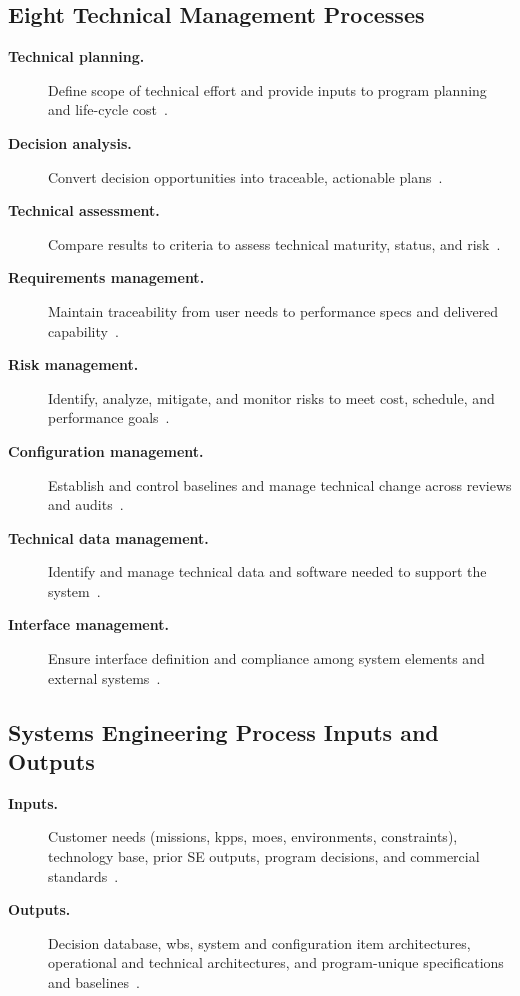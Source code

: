 \documentclass[../main.tex]{subfiles}
\begin{document}
\subsection{Eight Technical Management Processes}
\begin{description}
  \item[\textbf{Technical planning.}] Define scope of technical effort and provide inputs to program planning and life-cycle cost~\autocite{edo-3-5-1-systems-engineering-overview-2025}.
  \item[\textbf{Decision analysis.}] Convert decision opportunities into traceable, actionable plans~\autocite{edo-3-5-1-systems-engineering-overview-2025}.
  \item[\textbf{Technical assessment.}] Compare results to criteria to assess technical maturity, status, and risk~\autocite{edo-3-5-1-systems-engineering-overview-2025}.
  \item[\textbf{Requirements management.}] Maintain traceability from user needs to performance specs and delivered capability~\autocite{edo-3-5-1-systems-engineering-overview-2025}.
  \item[\textbf{Risk management.}] Identify, analyze, mitigate, and monitor risks to meet cost, schedule, and performance goals~\autocite{edo-3-5-1-systems-engineering-overview-2025}.
  \item[\textbf{Configuration management.}] Establish and control baselines and manage technical change across reviews and audits~\autocite{edo-3-5-1-systems-engineering-overview-2025}.
  \item[\textbf{Technical data management.}] Identify and manage technical data and software needed to support the system~\autocite{edo-3-5-1-systems-engineering-overview-2025}.
  \item[\textbf{Interface management.}] Ensure interface definition and compliance among system elements and external systems~\autocite{edo-3-5-1-systems-engineering-overview-2025}.
\end{description}

\subsection{Systems Engineering Process Inputs and Outputs}
\begin{description}
  \item[\textbf{Inputs.}] Customer needs (missions, \acp{kpp}, \acp{moe}, environments, constraints), technology base, prior SE outputs, program decisions, and commercial standards~\autocite{edo-3-5-1-systems-engineering-overview-2025}.
  \item[\textbf{Outputs.}] Decision database, \ac{wbs}, system and configuration item architectures, operational and technical architectures, and program-unique specifications and baselines~\autocite{edo-3-5-1-systems-engineering-overview-2025}.
\end{description}
\end{document}
